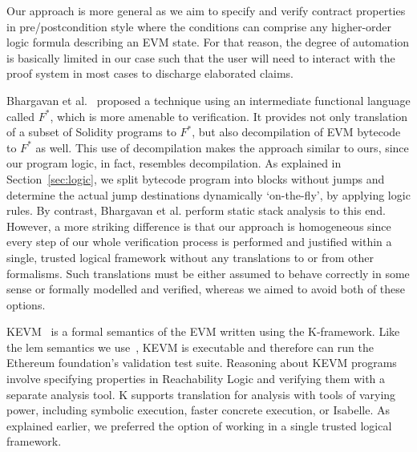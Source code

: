 \documentclass[sigplan,10pt,review]{acmart}\settopmatter{printfolios=true,printccs=false,printacmref=false}
\begin{document}
Our approach is more general as we aim to specify and verify contract properties in pre/postcondition
style where the conditions can comprise any higher-order logic formula describing an EVM state. 
For that reason, the degree of automation is basically limited in our case such that the user will need to interact 
with the proof system in most cases to discharge elaborated claims. 

Bhargavan et al.~\cite{Bhargavan:2016:FVS:2993600.2993611} proposed a technique using an
intermediate functional language called $F^*$,
which is more amenable to verification. 
It provides not only translation of a subset of Solidity programs 
to $F^*$, but also decompilation of EVM bytecode to $F^*$ as well.
This use of decompilation makes
the approach similar to ours, since our program logic, in fact, resembles decompilation.
As explained in Section~\ref{sec:logic}, we split bytecode program into blocks without jumps
and determine the actual jump destinations dynamically `on-the-fly', by applying logic rules.
By contrast, Bhargavan et al. perform static stack analysis to this end.
However, a more striking difference is that our approach is homogeneous since every step of our whole verification process 
is performed and justified within a single, trusted logical framework without any translations to or from other formalisms.
Such translations must be either assumed to behave correctly in some sense or
formally modelled and verified, whereas we aimed to avoid both of these options.

KEVM~\cite{Hildenbrandt_SZRDGR_17} is a formal semantics of the EVM written using the K-framework.
Like the lem semantics we use~\cite{Yoichi}, KEVM is executable and therefore can run the Ethereum foundation's validation test suite.
Reasoning about KEVM programs involve specifying properties in Reachability Logic and
verifying them with a separate analysis tool.
K supports translation for analysis with tools of varying
power, including symbolic execution, faster concrete execution, or Isabelle.
As explained earlier, we preferred the option of working in a single trusted logical framework.

\end{document}
